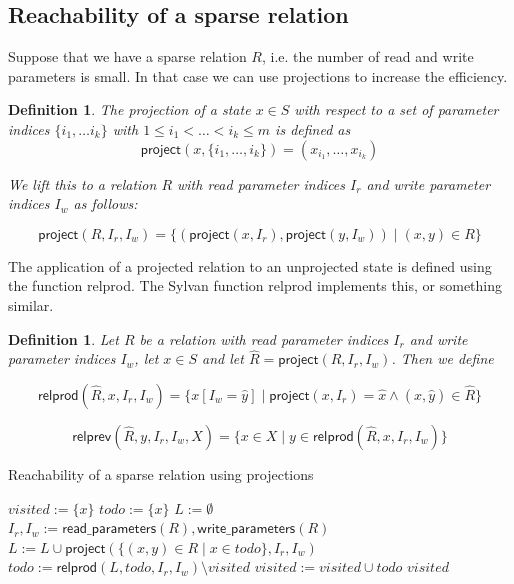 \documentclass{article}
\newtheorem{definition}[theorem]{Definition}
\newcommand{\var}[1]{\ensuremath{\textit{#1}}}
\begin{document}
\newpage
\subsection{Reachability of a sparse relation}

Suppose that we have a sparse relation $R$, i.e. the number of read and write parameters is small. In that case we can use projections to increase the efficiency. \\

\begin{definition}
The projection of a state $x \in S$ with respect to a set of parameter indices $\{ i_1, \ldots i_k \}$ with $1 \leq i_1 < \ldots < i_k \leq m$ is defined as
\[
\textsf{project}(x, \{ i_1, \ldots, i_k \} ) = (x_{i_1}, \ldots, x_{i_k})
\]

\noindent
We lift this to a relation $R$ with read parameter indices $I_r$ and write parameter indices $I_w$ as follows:

\[
\textsf{project}(R, I_r, I_w) = \{ (\textsf{project}(x,I_r), \textsf{project}(y,I_w)) \mid (x,y) \in R \}
\]
\end{definition}

\noindent
The application of a projected relation to an unprojected state is defined using the function \textsf{relprod}. The Sylvan function \textsf{relprod} implements this, or something similar.

\begin{definition}
Let $R$ be a relation with read parameter indices $I_r$ and write parameter indices $I_w$, let $x \in S$ and let
 $\hat{R} = \textsf{project}(R, I_r, I_w)$. Then we define

\[
    \textsf{relprod}(\hat{R}, x, I_r, I_w) =
        \{ 
          x[I_w = \hat{y}] \mid \textsf{project}(x, I_r) = \hat{x} \land 
          (\hat{x}, \hat{y}) \in \hat{R}
        \}
\]

\[
    \textsf{relprev}(\hat{R}, y, I_r, I_w, X) =
        \{ 
           x \in X \mid y \in \textsf{relprod}(\hat{R}, x, I_r, I_w)
        \}
\]
\end{definition}

\begin{algorithm}[h]
\caption{Reachability of a sparse relation using projections}
\label{alg:reachability3}
\begin{algorithmic}[1]
\State $\var{visited} := \{ x \}$
\State $\var{todo} := \{ x \}$
\State $L := \emptyset$ 
\State $I_r, I_w := \textsf{read\_parameters}(R), \textsf{write\_parameters}(R)$
\While {$\var{todo} \neq \emptyset$}
    \State $L := L \cup \textsf{project}(\{ (x,y) \in R \mid x \in \var{todo} \}, I_r, I_w) $  \label{line:r_successors}
    \State $\var{todo} := \textsf{relprod}(L, \var{todo}, I_r, I_w) \setminus \var{visited}$ 
    \State $\var{visited} := \var{visited} \cup \var{todo}$
\EndWhile
\State \Return \var{visited}
\EndFunction
\end{algorithmic}
\end{algorithm}
\end{document}
